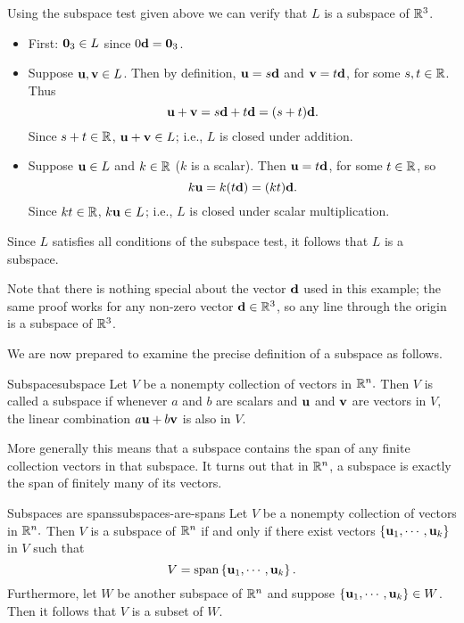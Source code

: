 \begin{solution}
Using the subspace test given above we can verify that $L$ is a subspace of $\mathbb{R}^3$. 
\begin{itemize}
\item First: $\mbox{\bf 0}_3\in L$ since $0\mbox{\bf d}=\mbox{\bf 0}_3$.
\item Suppose $\mbox{\bf u},\mbox{\bf v}\in L$.
Then by definition, $\mbox{\bf u}=s\mbox{\bf d}$ and $\mbox{\bf v}=t\mbox{\bf d}$, 
for some $s,t\in\mathbb{R}$.
Thus
\[ \mbox{\bf u}+\mbox{\bf v} = s\mbox{\bf d}+t\mbox{\bf d} = (s+t)\mbox{\bf d}.\]
Since $s+t\in\mathbb{R}$, $\mbox{\bf u}+\mbox{\bf v}\in L$;
i.e., $L$ is closed under addition.
\item Suppose $\mbox{\bf u}\in L$ and $k\in\mathbb{R}$ ($k$ is a scalar).
Then $\mbox{\bf u}=t\mbox{\bf d}$, for some $t\in\mathbb{R}$, so
\[ k\mbox{\bf u}=k(t\mbox{\bf d})=(kt)\mbox{\bf d}.\]
Since $kt\in\mathbb{R}$, $k\mbox{\bf u}\in L$;
i.e., $L$ is closed under scalar multiplication.
\end{itemize}
Since $L$ satisfies all conditions of the subspace test, it follows that $L$ is a subspace. 
\end{solution}

Note that there is nothing special about the vector $\mbox{\bf d}$ used
in this example; the same proof works for any non-zero
vector $\mbox{\bf d}\in\mathbb{R}^3$, so any line through the origin is
a subspace of $\mathbb{R}^3$.

We are now prepared to examine the precise definition of a subspace as follows.

\begin{definition}{Subspace}{subspace}
Let $V$ be a nonempty collection of vectors in $\mathbb{R}^{n}.$ Then
$V$ is called a subspace if whenever $a$ and $b$  are scalars and $\mbox{\bf u}$ and $\mbox{\bf v}$
are vectors in $V,$ the linear combination $a \mbox{\bf u}+ b \mbox{\bf v}$ is also in $V$.
\end{definition}

More generally this means that a subspace contains the span of any
finite collection vectors in that subspace. It turns out that in
$\mathbb{R}^{n}$, a subspace is exactly the span of finitely many of
its vectors.

\begin{theorem}{Subspaces are spans}{subspaces-are-spans}
Let $V$ be a nonempty collection of vectors in $\mathbb{R}^{n}.$ Then $V$ is a subspace of $\mathbb{R}^{n}$ if and only if there
exist vectors $\left\{\mbox{\bf u}_{1},\cdots ,\mbox{\bf u}_{k}\right\}$ in $V$ such that 
\[
V= \mbox{\rm span}\left\{\mbox{\bf u}_{1},\cdots ,\mbox{\bf u}_{k}\right\}. 
\]
Furthermore, let $W$ be another subspace of $\mathbb{R}^n$ and suppose $\left\{\mbox{\bf u}_{1},\cdots ,\mbox{\bf u}_{k}\right\} \in W$. Then it follows that $V$ is a subset of $W$. 
\end{theorem}

